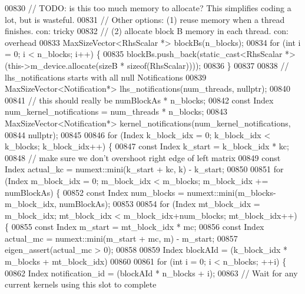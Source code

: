 \begin{DoxyCode}
{00830     \textcolor{comment}{// TODO: is this too much memory to allocate? This simplifies coding a lot, but is wasteful.}
00831     \textcolor{comment}{//       Other options: (1) reuse memory when a thread finishes. con: tricky}
00832     \textcolor{comment}{//                      (2) allocate block B memory in each thread. con: overhead}
00833     MaxSizeVector<RhsScalar *> blockBs(n\_blocks);
00834     \textcolor{keywordflow}{for} (\textcolor{keywordtype}{int} i = 0; i < n\_blocks; i++) \{
00835       blockBs.push\_back(static\_cast<RhsScalar *>(this->m\_device.allocate(sizeB * \textcolor{keyword}{sizeof}(RhsScalar))));
00836     \}
00837 
00838     \textcolor{comment}{// lhs\_notifications starts with all null Notifications}
00839     MaxSizeVector<Notification*> lhs\_notifications(num\_threads, \textcolor{keyword}{nullptr});
00840 
00841     \textcolor{comment}{// this should really be numBlockAs * n\_blocks;}
00842     \textcolor{keyword}{const} Index num\_kernel\_notifications = num\_threads * n\_blocks;
00843     MaxSizeVector<Notification*> kernel\_notifications(num\_kernel\_notifications,
00844                                                     \textcolor{keyword}{nullptr});
00845 
00846     \textcolor{keywordflow}{for} (Index k\_block\_idx = 0; k\_block\_idx < k\_blocks; k\_block\_idx++) \{
00847       \textcolor{keyword}{const} Index k\_start = k\_block\_idx * kc;
00848       \textcolor{comment}{// make sure we don't overshoot right edge of left matrix}
00849       \textcolor{keyword}{const} Index actual\_kc = numext::mini(k\_start + kc, k) - k\_start;
00850 
00851       \textcolor{keywordflow}{for} (Index m\_block\_idx = 0; m\_block\_idx < m\_blocks; m\_block\_idx += numBlockAs) \{
00852         \textcolor{keyword}{const} Index num\_blocks = numext::mini(m\_blocks-m\_block\_idx, numBlockAs);
00853 
00854         \textcolor{keywordflow}{for} (Index mt\_block\_idx = m\_block\_idx; mt\_block\_idx < m\_block\_idx+num\_blocks; mt\_block\_idx++) \{
00855           \textcolor{keyword}{const} Index m\_start = mt\_block\_idx * mc;
00856           \textcolor{keyword}{const} Index actual\_mc = numext::mini(m\_start + mc, m) - m\_start;
00857           eigen\_assert(actual\_mc > 0);
00858 
00859           Index blockAId = (k\_block\_idx * m\_blocks + mt\_block\_idx) %
00860 
00861           \textcolor{keywordflow}{for} (\textcolor{keywordtype}{int} i = 0; i < n\_blocks; ++i) \{
00862             Index notification\_id = (blockAId * n\_blocks + i);
00863             \textcolor{comment}{// Wait for any current kernels using this slot to complete}
}
\end{DoxyCode}
